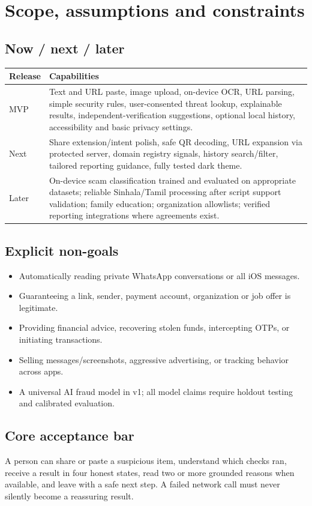 \documentclass[10pt,a4paper]{article}
\begin{document}
\section{Scope, assumptions and constraints}
\subsection{Now / next / later}
\begin{tabularx}{\linewidth}{@{}p{21mm}Y@{}}\toprule
\textbf{Release} & \textbf{Capabilities} \\ \midrule
MVP & Text and URL paste, image upload, on-device OCR, URL parsing, simple security rules, user-consented threat lookup, explainable results, independent-verification suggestions, optional local history, accessibility and basic privacy settings. \\
Next & Share extension/intent polish, safe QR decoding, URL expansion via protected server, domain registry signals, history search/filter, tailored reporting guidance, fully tested dark theme. \\
Later & On-device scam classification trained and evaluated on appropriate datasets; reliable Sinhala/Tamil processing after script support validation; family education; organization allowlists; verified reporting integrations where agreements exist. \\
\bottomrule\end{tabularx}

\subsection{Explicit non-goals}
\begin{itemize}
\item Automatically reading private WhatsApp conversations or all iOS messages.
\item Guaranteeing a link, sender, payment account, organization or job offer is legitimate.
\item Providing financial advice, recovering stolen funds, intercepting OTPs, or initiating transactions.
\item Selling messages/screenshots, aggressive advertising, or tracking behavior across apps.
\item A universal AI fraud model in v1; all model claims require holdout testing and calibrated evaluation.
\end{itemize}

\subsection{Core acceptance bar}
A person can share or paste a suspicious item, understand which checks ran, receive a result in four honest states, read two or more grounded reasons when available, and leave with a safe next step. A failed network call must never silently become a reassuring result.
\end{document}
